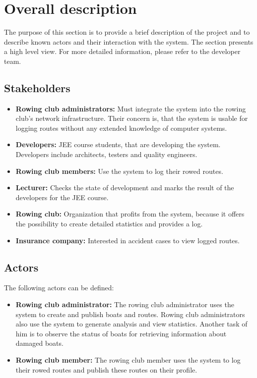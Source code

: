 \section{Overall description}
The purpose of this section is to provide a brief description of the project and to describe known actors and their interaction with the system. The section presents a high level view. For more detailed information, please refer to the developer team.

	\subsection{Stakeholders}
	\begin{itemize}
		\item \textbf{Rowing club administrators:} Must integrate the system into the rowing club's network infrastructure. Their concern is, that the system is usable for logging routes without any extended knowledge of computer systems.
		\item \textbf{Developers:} JEE course students, that are developing the system. Developers include architects, testers and quality engineers.
		\item \textbf{Rowing club members:} Use the system to log their rowed routes.
		\item \textbf{Lecturer:} Checks the state of development and marks the result of the developers for the JEE course.
		\item \textbf{Rowing club:} Organization that profits from the system, because it offers the possibility to create detailed statistics and provides a log.
		\item \textbf{Insurance company:} Interested in accident cases to view logged routes.
	\end{itemize}
	
	\subsection{Actors}
	The following actors can be defined:\\
	
	\begin{itemize}
		\item \textbf{Rowing club administrator:} The rowing club administrator uses the system to create and publish boats and routes. Rowing club administrators also use the system to generate analysis and view statistics. Another task of him is to observe the status of boats for retrieving information about damaged boats.
		\item \textbf{Rowing club member:} The rowing club member uses the system to log their rowed routes and publish these routes on their profile.
	\end{itemize}
	
